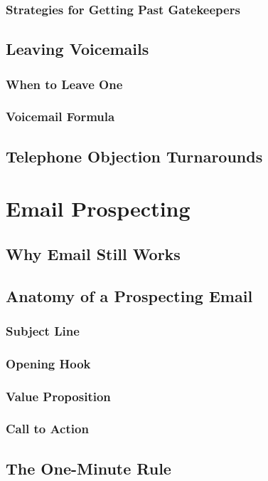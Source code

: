         \subsubsection{Strategies for Getting Past Gatekeepers}\mbox{}
    \subsection{Leaving Voicemails}\mbox{}
        \subsubsection{When to Leave One}\mbox{}
        \subsubsection{Voicemail Formula}\mbox{}
    \subsection{Telephone Objection Turnarounds}\mbox{}

\section{Email Prospecting}\mbox{}
    \subsection{Why Email Still Works}\mbox{}
    \subsection{Anatomy of a Prospecting Email}\mbox{}
        \subsubsection{Subject Line}\mbox{}
        \subsubsection{Opening Hook}\mbox{}
        \subsubsection{Value Proposition}\mbox{}
        \subsubsection{Call to Action}\mbox{}
    \subsection{The One-Minute Rule}\mbox{}
